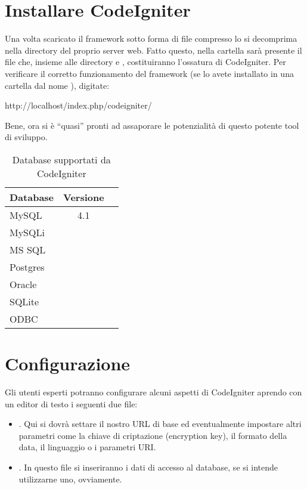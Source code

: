 \section{Installare CodeIgniter}
Una volta scaricato il framework sotto forma di file compresso lo si decomprima nella directory del proprio server web. Fatto questo, nella cartella sarà presente il file  che, insieme alle directory  e , costituiranno l'ossatura di CodeIgniter. Per verificare il corretto funzionamento del framework (se lo avete installato in una cartella dal nome ), digitate:

\begin{code}
http://localhost/index.php/codeigniter/
\end{code}

Bene, ora si è ``quasi'' pronti ad assaporare le potenzialità di questo potente tool di sviluppo. 

\begin{table}
\caption{Database supportati da CodeIgniter}
\label{tab:dbsupportati}
\centering
\begin{tabular}{lcr}
\toprule
Database & Versione \\ 
\midrule
MySQL & 4.1 \\
\midrule
MySQLi \\
\midrule
MS SQL \\
\midrule
Postgres \\
\midrule
Oracle \\
\midrule
SQLite \\
\midrule
ODBC\\
\bottomrule
\end{tabular}
\end{table}

\label{cap:dbconfig}
\section{Configurazione}
Gli utenti esperti potranno configurare alcuni aspetti di CodeIgniter aprendo con un editor di testo i seguenti due file:

\begin{itemize}
\item {}. Qui si dovrà settare il nostro \ac{URL} di base ed eventualmente impostare altri parametri come la chiave di criptazione (encryption key), il formato della data, il linguaggio o i parametri \ac{URI}.
\item {}. In questo file si inseriranno i dati di accesso al database, se si intende utilizzarne uno, ovviamente.
\end{itemize}

